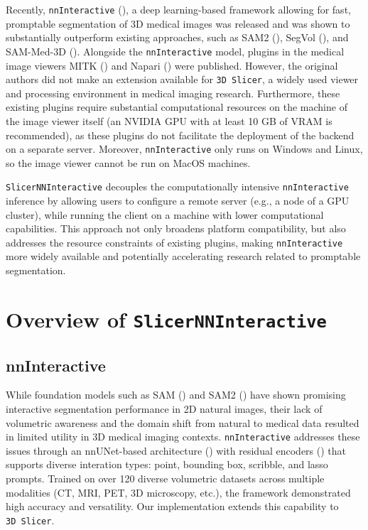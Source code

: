 \documentclass[
]{article}
\begin{document}
Recently, \texttt{nnInteractive}
(), a deep
learning-based framework allowing for fast, promptable segmentation of
3D medical images was released and was shown to substantially outperform
existing approaches, such as SAM2
(), SegVol
(), and SAM-Med-3D
(). Alongside the
\texttt{nnInteractive} model, plugins in the medical image viewers MITK
() and Napari
() were
published. However, the original authors did not make an extension
available for \texttt{3D\ Slicer}, a widely used viewer and processing
environment in medical imaging research. Furthermore, these existing
plugins require substantial computational resources on the machine of
the image viewer itself (an NVIDIA GPU with at least 10 GB of VRAM is
recommended), as these plugins do not facilitate the deployment of the
backend on a separate server. Moreover, \texttt{nnInteractive} only runs
on Windows and Linux, so the image viewer cannot be run on MacOS
machines.

\texttt{SlicerNNInteractive} decouples the computationally intensive
\texttt{nnInteractive} inference by allowing users to configure a remote
server (e.g., a node of a GPU cluster), while running the client on a
machine with lower computational capabilities. This approach not only
broadens platform compatibility, but also addresses the resource
constraints of existing plugins, making \texttt{nnInteractive} more
widely available and potentially accelerating research related to
promptable segmentation.

\section{\texorpdfstring{Overview of
\texttt{SlicerNNInteractive}}{Overview of SlicerNNInteractive}}\label{overview-of-slicernninteractive}

\subsection{nnInteractive}\label{nninteractive}

While foundation models such as SAM () and SAM2 () have shown promising interactive segmentation performance in
2D natural images, their lack of volumetric awareness and the domain
shift from natural to medical data resulted in limited utility in 3D
medical imaging contexts. \texttt{nnInteractive} addresses these issues
through an nnUNet-based architecture
() with residual
encoders () that
supports diverse interation types: point, bounding box, scribble, and
lasso prompts. Trained on over 120 diverse volumetric datasets across
multiple modalities (CT, MRI, PET, 3D microscopy, etc.), the framework
demonstrated high accuracy and versatility. Our implementation extends
this capability to \texttt{3D\ Slicer}.
\end{document}
